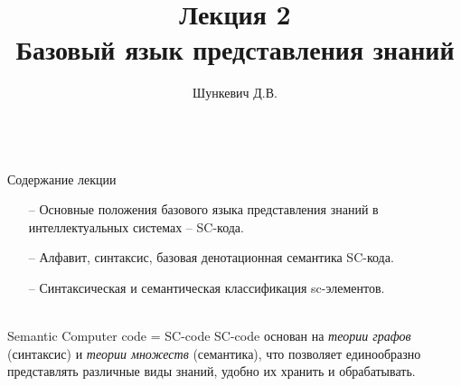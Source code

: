 \title{Лекция 2\\Базовый язык представления знаний}   
\author[]{Шункевич Д.В.}

\begin{frame}
	\titlepage
\end{frame}

\begin{frame}{\\Содержание лекции}
	\topline
	\justifying
	\begin{itemize}
	\item[--] Основные положения базового языка представления знаний в интеллектуальных системах – SC-кода. 
	\item[--] Алфавит, синтаксис, базовая денотационная семантика SC-кода. 
	\item[--] Синтаксическая и семантическая классификация sc-элементов.
	\end{itemize}
\end{frame}


\begin{frame}{\\Semantic Computer code = SC-code}
	SC-code основан на \textit{теории графов} (синтаксис) и \textit{теории множеств} (семантика), что позволяет единообразно представлять различные виды знаний, удобно их хранить и обрабатывать.
\end{frame}

